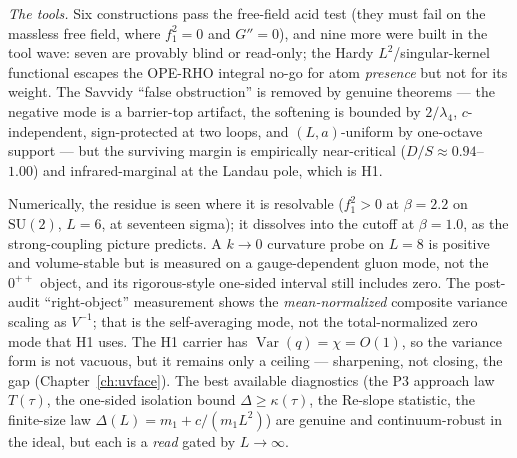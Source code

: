 \documentclass[11pt,a4paper]{article}
\begin{document}
\begin{tcolorbox}[enhanced, breakable, colback=white, colframe=white, boxrule=0pt,
  left=6pt, right=6pt, top=4pt, bottom=4pt, parbox=false]
\emph{The tools.} Six constructions pass the free-field acid test (they must fail on the massless
free field, where $f_1^2=0$ and $G''=0$), and nine more were built in the tool wave: seven are
provably blind or read-only; the Hardy $L^2$/singular-kernel functional escapes the OPE-RHO
integral no-go for atom \emph{presence} but not for its weight. The Savvidy ``false obstruction''
is removed by genuine theorems --- the negative mode is a barrier-top artifact, the softening is
bounded by $2/\lambda_4$, $c$-independent, sign-protected at two loops, and $(L,a)$-uniform by
one-octave support --- but the surviving margin is empirically near-critical ($D/S\approx0.94$--
$1.00$) and infrared-marginal at the Landau pole, which is H1.

Numerically, the residue is seen where it is resolvable ($f_1^2>0$ at $\beta=2.2$ on
$\mathrm{SU}(2)$, $L=6$, at seventeen sigma); it dissolves into the cutoff at $\beta=1.0$, as the
strong-coupling picture predicts. A $k\to0$ curvature probe on $L=8$ is positive and
volume-stable but is measured on a gauge-dependent gluon mode, not the $0^{++}$ object, and its
rigorous-style one-sided interval still includes zero. The post-audit ``right-object''
measurement shows the \emph{mean-normalized} composite variance scaling as $V^{-1}$; that is the
self-averaging mode, not the total-normalized zero mode that H1 uses. The H1 carrier has
$\operatorname{Var}(q)=\chi=O(1)$, so the variance form is not vacuous, but it remains only a
ceiling --- sharpening, not closing, the gap (Chapter~\ref{ch:uvface}).
The best available diagnostics (the P3 approach law $T(\tau)$, the one-sided isolation bound
$\Delta\ge\kappa(\tau)$, the Re-slope statistic, the finite-size law $\Delta(L)=m_1+c/(m_1L^2)$)
are genuine and continuum-robust in the ideal, but each is a \emph{read} gated by $L\to\infty$.


\end{tcolorbox}
\end{document}
